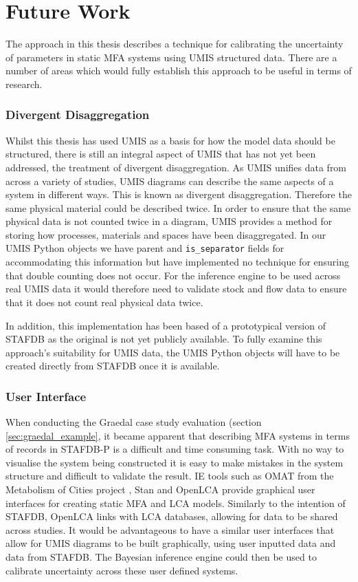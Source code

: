 \documentclass[ %
                    author={Tom Jager},
                supervisor={Dr. Daniel Schien},
                    degree={MEng},
                     title={A Bayesian Inference Engine for Calibrating Uncertainty over UMIS Structured MFA Systems},
                  subtitle={},
                      type={research},
                      year={2019} ]{dissertation}
\begin{document}
\section{Future Work}
The approach in this thesis describes a technique for calibrating the uncertainty of parameters in static MFA systems using UMIS structured data. There are a number of areas which would fully establish this approach to be useful in terms of research. 

\subsubsection{Divergent Disaggregation}
Whilst this thesis has used UMIS as a basis for how the model data should be structured, there is still an integral aspect of UMIS that has not yet been addressed, the treatment of divergent disaggregation. As UMIS unifies data from across a variety of studies, UMIS diagrams can describe the same aspects of a system in different ways. This is known as divergent disaggregation. Therefore the same physical material could be described twice. In order to ensure that the same physical data is not counted twice in a diagram, UMIS provides a method for storing how processes, materials and spaces have been disaggregated. In our UMIS Python objects we have parent and \texttt{is\_separator} fields for accommodating this information but have implemented no technique for ensuring that double counting does not occur. For the inference engine to be used across real UMIS data it would therefore need to validate stock and flow data to ensure that it does not count real physical data twice.

In addition, this implementation has been based of a prototypical version of STAFDB as the original is not yet publicly available. To fully examine this approach's suitability for UMIS data, the UMIS Python objects will have to be created directly from STAFDB once it is available.

\subsubsection{User Interface}
When conducting the Graedal case study evaluation (section \ref{sec:graedal_example}, it became apparent that describing MFA systems in terms of records in STAFDB-P is a difficult and time consuming task. With no way to visualise the system being constructed it is easy to make mistakes in the system structure and difficult to validate the result. IE tools such as OMAT from the Metabolism of Cities project \cite{MetabolismOfCities}, Stan \cite{cencic2008material} and OpenLCA provide graphical user interfaces for creating static MFA and LCA models. Similarly to the intention of STAFDB, OpenLCA links with LCA databases, allowing for data to be shared across studies. It would be advantageous to have a similar user interfaces that allow for UMIS diagrams to be built graphically, using user inputted data and data from STAFDB. The Bayesian inference engine could then be used to calibrate uncertainty across these user defined systems.
\end{document}
